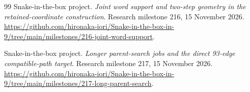 \documentclass[11pt,a4paper]{article}
\theoremstyle{definition}
\theoremstyle{remark}
\begin{document}
\begin{thebibliography}{99}
Snake-in-the-box project. \emph{Joint word support and two-step geometry
in the retained-coordinate construction}. Research milestone 216,
15 November 2026.
\url{https://github.com/hironaka-iori/Snake-in-the-box-in-9/tree/main/milestones/216-joint-word-support}.


Snake-in-the-box project. \emph{Longer parent-search jobs and the direct
93-edge compatible-path target}. Research milestone 217, 15 November 2026.
\url{https://github.com/hironaka-iori/Snake-in-the-box-in-9/tree/main/milestones/217-long-parent-search}.

\end{thebibliography}
\end{document}
